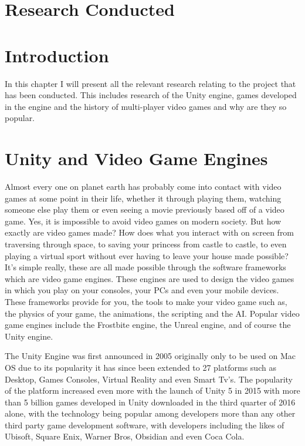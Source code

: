 \documentclass[10pt,a4paperpaper,openright]{book}
\begin{document}
\section{Research Conducted}\label{research-conducted}

\section{Introduction}\label{introduction}

In this chapter I will present all the relevant research relating to the
project that has been conducted. This includes research of the Unity
engine, games developed in the engine and the history of multi-player
video games and why are they so popular.

\section{Unity and Video Game
Engines}\label{unity-and-video-game-engines}

Almost every one on planet earth has probably come into contact with
video games at some point in their life, whether it through playing
them, watching someone else play them or even seeing a movie previously
based off of a video game. Yes, it is impossible to avoid video games on
modern society. But how exactly are video games made? How does what you
interact with on screen from traversing through space, to saving your
princess from castle to castle, to even playing a virtual sport without
ever having to leave your house made possible? It's simple really, these
are all made possible through the software frameworks which are video
game engines. These engines are used to design the video games in which
you play on your consoles, your PCs and even your mobile devices. These
frameworks provide for you, the tools to make your video game such as,
the physics of your game, the animations, the scripting and the AI.
Popular video game engines include the Frostbite engine, the Unreal
engine, and of course the Unity engine.

The Unity Engine was first announced in 2005 originally only to be used
on Mac OS due to its popularity it has since been extended to 27
platforms such as Desktop, Games Consoles, Virtual Reality and even
Smart Tv's. The popularity of the platform increased even more with the
launch of Unity 5 in 2015 with more than 5 billion games developed in
Unity downloaded in the third quarter of 2016 alone, with the technology
being popular among developers more than any other third party game
development software, with developers including the likes of Ubisoft,
Square Enix, Warner Bros, Obsidian and even Coca Cola.
\end{document}
